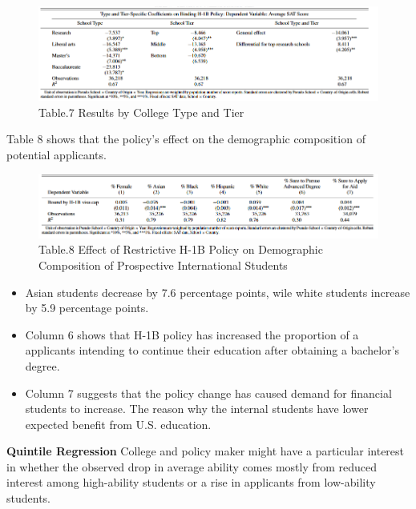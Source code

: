 \documentclass[../root]{subfiles}
\begin{document}
   \begin{figure}
        \centering
        \includegraphics[width = \linewidth]{1016sugiyama/Table_7.png}
        \caption{Table.7 Results by College Type and Tier}
        \label{fig:my_label}
    \end{figure}
   
   Table 8 shows that the policy's effect on the demographic composition of potential applicants.
   
   \begin{figure}
        \centering
        \includegraphics[width = \linewidth]{1016sugiyama/Table_8.png}
        \caption{Table.8 Effect of Restrictive H-1B Policy on Demographic Composition of Prospective International Students}
        \label{fig:my_label}
    \end{figure}
    
    \begin{itemize}
        \item Asian students decrease by 7.6 percentage points, wile white students increase by 5.9 percentage points. 
        \item Column 6 shows that H-1B policy has increased the proportion of a applicants intending to continue their education after obtaining a bachelor's degree. 
        \item Column 7 suggests that the policy change has caused demand for financial students to increase. The reason why the internal students have lower expected benefit from U.S. education.
    \end{itemize}
    
    {\bf Quintile Regression}
    College and policy maker might have a particular interest in whether the observed drop in average ability comes mostly from reduced interest among high-ability students or a rise in applicants from low-ability students.  
    
\end{document}
